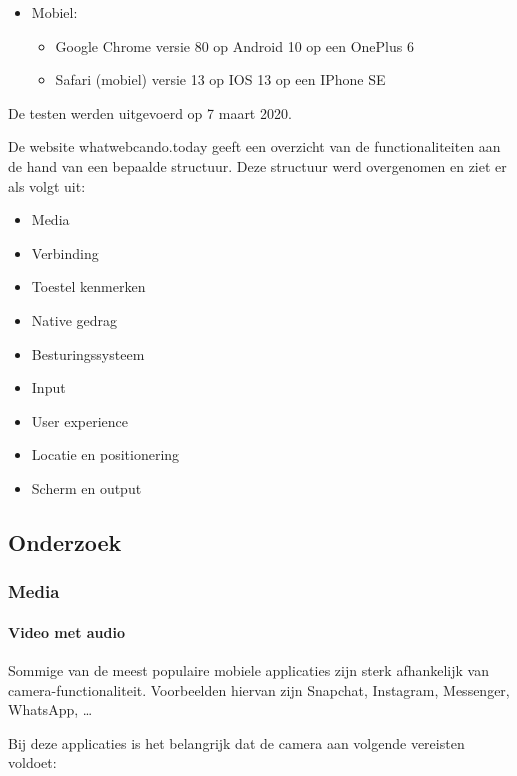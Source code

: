 \begin{itemize}
   \item Mobiel:
   \begin{itemize}
     \item Google Chrome versie 80 op Android 10 op een OnePlus 6
     \item Safari (mobiel) versie 13 op IOS 13 op een IPhone SE 
     
   \end{itemize}
\end{itemize}

De testen werden uitgevoerd op 7 maart 2020.

De website whatwebcando.today geeft een overzicht van de functionaliteiten aan de hand van een bepaalde structuur. Deze structuur werd overgenomen en ziet er als volgt uit:
   \begin{itemize}
     \item	Media
     \item	Verbinding
     \item	Toestel kenmerken
     \item	Native gedrag
     \item	Besturingssysteem
     \item	Input
     \item	User experience
     \item	Locatie en positionering
     \item	Scherm en output
   \end{itemize}

\subsection{Onderzoek}

\subsubsection{Media}

\paragraph{Video met audio }

Sommige van de meest populaire mobiele applicaties zijn sterk afhankelijk van camera-functionaliteit. Voorbeelden hiervan zijn Snapchat, Instagram, Messenger, WhatsApp, … 

Bij deze applicaties is het belangrijk dat de camera aan volgende vereisten voldoet:

